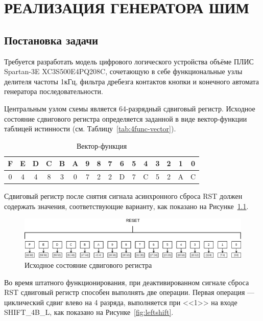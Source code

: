 \chapter{РЕАЛИЗАЦИЯ ГЕНЕРАТОРА ШИМ}
\section{Постановка задачи}	
Требуется разработать модель цифрового логического устройства объёме ПЛИС Spartan-3E XC3S500E4PQ208C, сочетающую в себе
функциональные узлы делителя частоты 1кГц, фильтра дребезга контактов
кнопки и конечного автомата генератора последовательности.

Центральным узлом схемы является 64-разрядный сдвиговый регистр.
Исходное состояние сдвигового регистра определяется заданной в виде вектор-функции таблицей истинности (см. Таблицу~\ref{tab:4func-vector}).


\begin{table}[h!]
	\centering
	\small
	\caption{Вектор-функция}
	\begin{tabular}{|c|c|c|c|c|c|c|c|c|c|c|c|c|c|c|c|}
		\hline
		F & E & D & C & B & A & 9 & 8 & 7 & 6 & 5 & 4 & 3 & 2 & 1 & 0 \\ \hline\hline
		0 & 4 & 4 & 8 & 3 & 0 & 7 & 2 & 2 & D & 7 & C & 5 & 2 & A & C \\ \hline
	\end{tabular}
	\label{tab:5func-vector}
\end{table}

Сдвиговый регистр после снятия сигнала асинхронного сброса RST
должен содержать значения, соответствующие варианту, как показано на
Рисунке~\ref{fig:set-reset}.


\begin{figure}
	\centering
	\includegraphics[width=0.75\linewidth]{course-plis/images/lab5/set-reset}
	\caption{Исходное состояние сдвигового регистра}
	\label{fig:set-reset}
\end{figure}



Во время штатного функционирования, при деактивированном сигнале
сброса RST сдвиговый регистр способен выполнять две операции.
Первая операция --- циклический сдвиг влево на 4 разряда, выполняется при
<<1>> на входе SHIFT\_4B\_L, как показано на Рисунке~\ref{fig:leftshift}.

